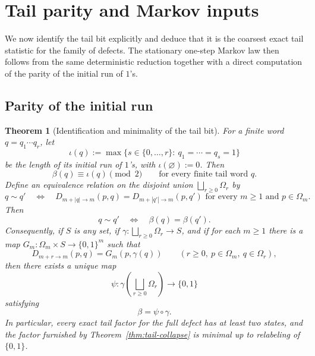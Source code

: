 \documentclass[11pt,reqno]{amsart}
\numberwithin{equation}{section}
\theoremstyle{plain}
\newtheorem{theorem}{Theorem}[section]
\theoremstyle{definition}
\theoremstyle{remark}
\begin{document}
\section{Tail parity and Markov inputs}
\label{sec:markov}

We now identify the tail bit explicitly and deduce that it is the coarsest
exact tail statistic for the family of defects.  The stationary one-step
Markov law then follows from the same deterministic reduction together with a
direct computation of the parity of the initial run of $1$'s.

\subsection{Parity of the initial run}

\begin{theorem}[Identification and minimality of the tail bit]
\label{thm:tail-rigidity}
For a finite word $q=q_1\cdots q_r$, let
\[
\iota(q):=\max\{s\in\{0,\dots,r\}:\ q_1=\cdots=q_s=1\}
\]
be the length of its initial run of $1$'s, with $\iota(\varnothing):=0$.
Then
\[
\beta(q)\equiv \iota(q)\pmod 2
\qquad
\text{for every finite tail word }q.
\]
Define an equivalence relation on the disjoint union
$\bigsqcup_{r\ge 0}\Omega_r$ by
\[
q\sim q'
\quad\Longleftrightarrow\quad
D_{m+|q|\to m}(p,q)=D_{m+|q'|\to m}(p,q')
\text{ for every }m\ge 1\text{ and }p\in\Omega_m.
\]
Then
\[
q\sim q'
\quad\Longleftrightarrow\quad
\beta(q)=\beta(q').
\]
Consequently, if $S$ is any set, if
$\gamma:\bigsqcup_{r\ge 0}\Omega_r\to S$, and if for each $m\ge 1$ there is a
map $G_m:\Omega_m\times S\to\{0,1\}^m$ such that
\[
D_{m+r\to m}(p,q)=G_m(p,\gamma(q))
\qquad
(r\ge 0,\ p\in\Omega_m,\ q\in\Omega_r),
\]
then there exists a unique map
\[
\psi:\gamma\!\left(\bigsqcup_{r\ge 0}\Omega_r\right)\to\{0,1\}
\]
satisfying
\[
\beta=\psi\circ\gamma.
\]
In particular, every exact tail factor for the full defect has at least two
states, and the factor furnished by Theorem~\ref{thm:tail-collapse} is minimal
up to relabeling of $\{0,1\}$.
\end{theorem}
\end{document}
